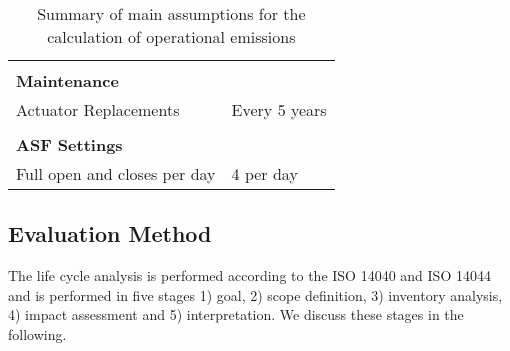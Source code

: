 \begin{table}[H]
\begin{tabular}{ll}
                              &                                                \\
\textbf{Maintenance}          &                                                \\
Actuator Replacements         & Every 5 years                                  \\
                              &                                                \\
\textbf{ASF Settings}         &                                                \\
Full open and closes per day  & 4 per day                                      \\
\hline
\end{tabular}
\caption{Summary of main assumptions for the calculation of operational emissions}
\label{tab:AssumptionsOpp}
\end{table}



\subsection{Evaluation Method}
The life cycle analysis is performed according to the ISO 14040 and ISO 14044 and is performed in five stages 1) goal, 2) scope definition, 3) inventory analysis, 4) impact assessment and 5) interpretation. We discuss these stages in the following. %


